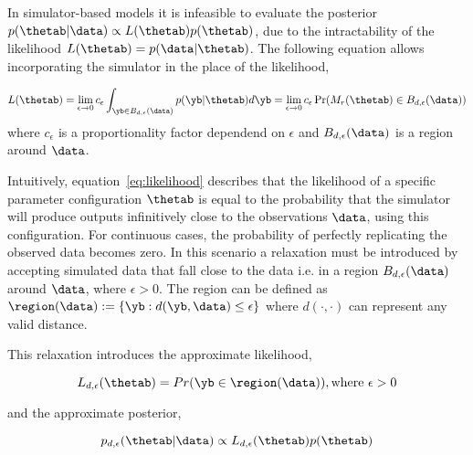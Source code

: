 In simulator-based models it is infeasible to evaluate the posterior
$p(\thetab|\data) \propto L(\thetab)p(\thetab)$, due to the
intractability of the likelihood $L(\thetab) = p(\data|\thetab)$. The
following equation allows incorporating the simulator in the place of
the likelihood,

\begin{equation} \label{eq:likelihood}
  L(\thetab) =
  \lim_{\epsilon \to 0} c_\epsilon \int_{\yb \in B_{d,\epsilon}(\data)} p(\yb|\thetab)d\yb =
  \lim_{\epsilon \to 0} c_\epsilon \Pr(M_r(\thetab) \in B_{d,\epsilon}(\data))
\end{equation}
%
where $c_\epsilon$ is a proportionality factor dependend on
$\epsilon$ and $B_{d,\epsilon}(\data)$ is a region around $\data$.

Intuitively, equation~\ref{eq:likelihood} describes that the
likelihood of a specific parameter configuration $\thetab$ is equal to
the probability that the simulator will produce outputs infinitively
close to the observations $\data$, using this configuration. For
continuous cases, the probability of perfectly replicating the
observed data becomes zero. In this scenario a relaxation must be
introduced by accepting simulated data that fall close to the data
i.e. in a region $B_{d,\epsilon}(\data)$ around $\data$, where
$\epsilon > 0$. The region can be defined as
$\region (\data) := \{\yb: d(\yb, \data) \leq \epsilon \}$ where
$d(\cdot, \cdot)$ can represent any valid distance.

This relaxation introduces the approximate likelihood,

\begin{equation} \label{eq:approx_likelihood}
  L_{d, \epsilon}(\thetab) = Pr(\yb \in \region(\data)), \text{where  } \epsilon > 0
\end{equation}

and the approximate posterior,

\begin{equation} \label{eq:approx_posterior}
  p_{d,\epsilon}(\thetab|\data) \propto L_{d, \epsilon}(\thetab) p(\thetab)
\end{equation}